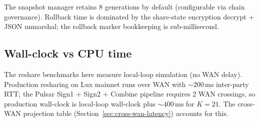 The snapshot manager retains 8 generations by default (configurable via chain governance). Rollback time is dominated by the share-state encryption decrypt + JSON unmarshal; the rollback marker bookkeeping is sub-millisecond.

\subsection{Wall-clock vs CPU time}

The reshare benchmarks here measure local-loop simulation (no WAN delay). Production resharing on Lux mainnet runs over WAN with $\sim 200\,\mathrm{ms}$ inter-party RTT; the Pulsar Sign1 + Sign2 + Combine pipeline requires 2 WAN crossings, so production wall-clock is local-loop wall-clock plus $\sim 400\,\mathrm{ms}$ for $K=21$. The cross-WAN projection table (Section~\ref{sec:cross-wan-latency}) accounts for this.
